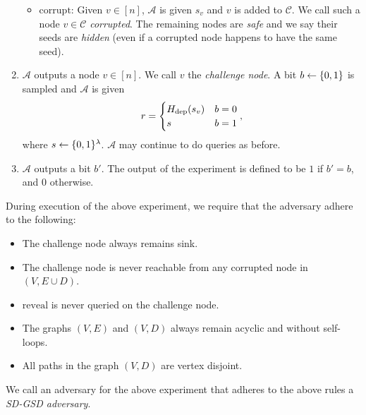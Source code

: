 \begin{definition}
\begin{enumerate}[1.]
\begin{itemize}
			      \item $\mathrm{corrupt}$: Given $v \in [n]$, $\mathcal{A}$ is given $s_v$ and $v$ is added to $\mathcal{C}$. We call such a node $v \in \mathcal{C}$ \emph{corrupted}. The remaining nodes are \emph{safe} and we say their seeds are \emph{hidden} (even if a corrupted node happens to have the same seed).
		      \end{itemize}
		\item $\mathcal{A}$ outputs a node $v \in [n]$. We call $v$ the \emph{challenge node}. A bit $b \leftarrow \{0, 1\}$ is sampled and $\mathcal{A}$ is given
		      $$
			      r = \begin{cases}
				      H_\mathrm{dep}(s_v) & b = 0 \\
				      s          & b = 1
			      \end{cases},
		      $$
		      where $s \leftarrow \{0, 1\}^\lambda$. $\mathcal{A}$ may continue to do queries as before.
		\item $\mathcal{A}$ outputs a bit $b'$. The output of the experiment is defined to be $1$ if $b' = b$, and $0$ otherwise.
	\end{enumerate}

	During execution of the above experiment, we require that the adversary adhere to the following:
	\begin{itemize}
		\item The challenge node always remains sink.
		\item The challenge node is never reachable from any corrupted node in $(V, E \cup D)$.
		\item $\mathrm{reveal}$ is never queried on the challenge node.
		\item The graphs $(V, E)$ and $(V, D)$ always remain acyclic and without self-loops.
		\item All paths in the graph $(V, D)$ are vertex disjoint.
	\end{itemize}

	We call an adversary for the above experiment that adheres to the above rules a \emph{SD-GSD adversary}.

\end{definition}



